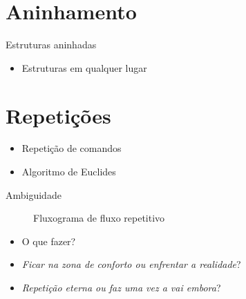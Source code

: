 \documentclass[14pt]{beamer}
\begin{document}
	\section{Aninhamento}
		\begin{frame}{Estruturas aninhadas}
			\begin{itemize}
				\presentationPause\item Estruturas em qualquer lugar
			\end{itemize}
		\end{frame}

	\section{Repetições}
		\begin{frame}
			\begin{itemize}
				\presentationPause\item Repetição de comandos
				\presentationPause\item Algoritmo de Euclides
			\end{itemize}
		\end{frame}

		\begin{frame}
			
		\end{frame}
		
		\begin{frame}{Ambiguidade}
			\presentationPause
			\begin{figure}
				\centering
				
				\caption{Fluxograma de fluxo repetitivo}
				\label{fig.flow.loop}
			\end{figure}
			\begin{itemize}
				\presentationPause\item O que fazer?
				\presentationPause\item \emph{Ficar na zona de conforto ou enfrentar a realidade}?
				\presentationPause\item \emph{Repetição eterna ou faz uma vez a vai embora}?
			\end{itemize}
		\end{frame}
\end{document}
